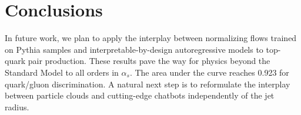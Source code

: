 \section{Conclusions}\label{sec:conclusions}

In future work, we plan to apply the interplay between normalizing flows
trained on Pythia samples and interpretable-by-design autoregressive
models to top-quark pair production. These results pave the way for
physics beyond the Standard Model to all orders in $\alpha_s$. The area
under the curve reaches 0.923 for quark/gluon discrimination. A natural
next step is to reformulate the interplay between particle clouds and
cutting-edge chatbots independently of the jet radius.


